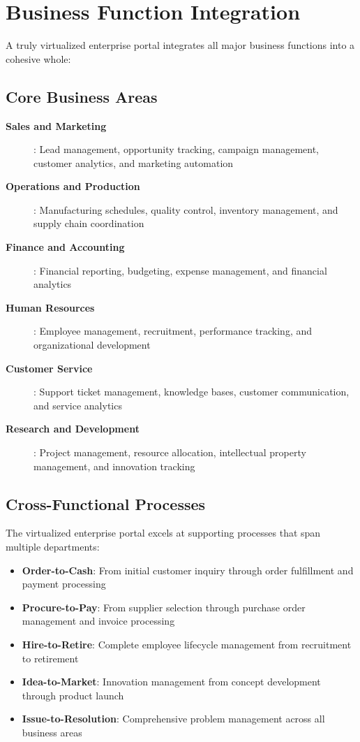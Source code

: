 \section{Business Function Integration}
\label{sec:business-integration}

A truly virtualized enterprise portal integrates all major business functions into a cohesive whole:

\subsection{Core Business Areas}

\begin{description}
\item[\textbf{Sales and Marketing}]: Lead management, opportunity tracking, campaign management, customer analytics, and marketing automation
\item[\textbf{Operations and Production}]: Manufacturing schedules, quality control, inventory management, and supply chain coordination
\item[\textbf{Finance and Accounting}]: Financial reporting, budgeting, expense management, and financial analytics
\item[\textbf{Human Resources}]: Employee management, recruitment, performance tracking, and organizational development
\item[\textbf{Customer Service}]: Support ticket management, knowledge bases, customer communication, and service analytics
\item[\textbf{Research and Development}]: Project management, resource allocation, intellectual property management, and innovation tracking
\end{description}

\subsection{Cross-Functional Processes}

The virtualized enterprise portal excels at supporting processes that span multiple departments:

\begin{itemize}
	\item \textbf{Order-to-Cash}: From initial customer inquiry through order fulfillment and payment processing
	\item \textbf{Procure-to-Pay}: From supplier selection through purchase order management and invoice processing
	\item \textbf{Hire-to-Retire}: Complete employee lifecycle management from recruitment to retirement
	\item \textbf{Idea-to-Market}: Innovation management from concept development through product launch
	\item \textbf{Issue-to-Resolution}: Comprehensive problem management across all business areas
\end{itemize}

